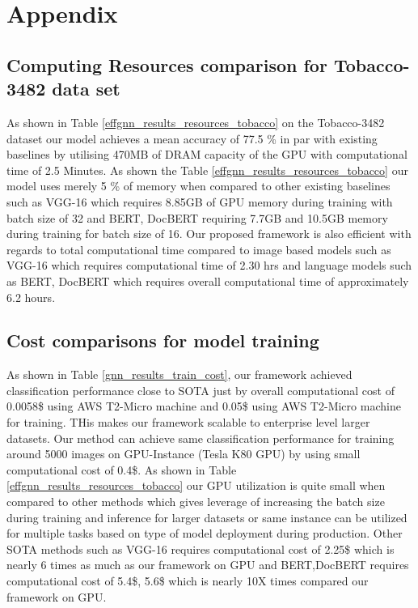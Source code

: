 \section{Appendix}

\subsection{Computing Resources comparison for Tobacco-3482 data set}
As shown in Table \ref{effgnn_results_resources_tobacco} on the Tobacco-3482 dataset our model achieves a mean accuracy of 77.5 \% in par with existing baselines by utilising 470MB of DRAM capacity of the GPU with computational time of 2.5 Minutes. As shown the Table \ref{effgnn_results_resources_tobacco} our model uses merely 5 \% of memory when compared to other existing baselines such as VGG-16 which requires 8.85GB of GPU memory during training with batch size of 32 and BERT, DocBERT requiring 7.7GB and 10.5GB memory during training for batch size of 16. Our proposed framework is also efficient with regards to total computational time compared to  image based models such as VGG-16 which requires computational time of 2.30 hrs and language models such as BERT, DocBERT which requires overall computational time of approximately 6.2 hours.
\subsection{Cost comparisons for model training}
As shown in Table \ref{gnn_results_train_cost}, our framework achieved classification performance close to SOTA just by overall computational cost of 0.0058\$ using AWS T2-Micro machine and 0.05\$ using AWS T2-Micro machine for training. THis makes our framework scalable to enterprise level larger datasets. Our method can achieve same classification performance for training around 5000 images on GPU-Instance (Tesla K80 GPU) by using small computational cost of 0.4\$. As shown in Table \ref{effgnn_results_resources_tobacco} our GPU utilization is quite small when compared to other methods which gives leverage of increasing the batch size during training and inference for larger datasets or same instance can be utilized for multiple tasks based on type of model deployment during production. Other SOTA methods such as VGG-16 requires computational cost of 2.25\$ which is nearly 6 times as much as our framework on GPU and BERT,DocBERT requires computational cost of 5.4\$, 5.6\$ which is nearly 10X times compared our framework on GPU.


